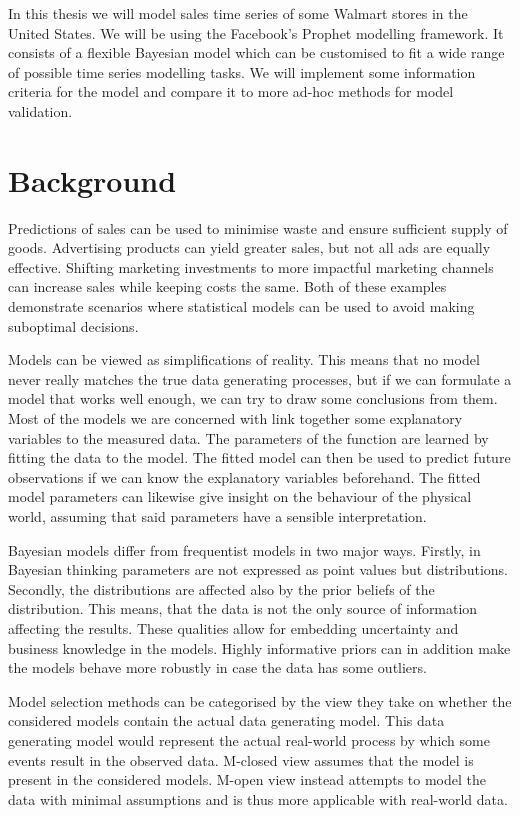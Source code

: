 \documentclass[english, 12pt, a4paper, sci, utf8, a-1b, online]{aaltothesis}
\begin{document}
In this thesis we will model sales time series of some Walmart stores in the United States. We will be using the Facebook's Prophet modelling framework. It consists of a flexible Bayesian model which can be customised to fit a wide range of possible time series modelling tasks. We will implement some information criteria for the model and compare it to more ad-hoc methods for model validation.




\section{Background}


Predictions of sales can be used to minimise waste and ensure sufficient supply of goods. Advertising products can yield greater sales, but not all ads are equally effective. Shifting marketing investments to more impactful marketing channels can increase sales while keeping costs the same. Both of these examples demonstrate scenarios where statistical models can be used to avoid making suboptimal decisions.

Models can be viewed as simplifications of reality. This means that no model never really matches the true data generating processes, but if we can formulate a model that works well enough, we can try to draw some conclusions from them. Most of the models we are concerned with link together some explanatory variables to the measured data. The parameters of the function are learned by fitting the data to the model. The fitted model can then be used to predict future observations if we can know the explanatory variables beforehand. The fitted model parameters can likewise give insight on the behaviour of the physical world, assuming that said parameters have a sensible interpretation.

Bayesian models differ from frequentist models in two major ways. Firstly, in Bayesian thinking parameters are not expressed as point values but distributions. Secondly, the distributions are affected also by the prior beliefs of the distribution. This means, that the data is not the only source of information affecting the results. These qualities allow for embedding uncertainty and business knowledge in the models. Highly informative priors can in addition make the models behave more robustly in case the data has some outliers. 

Model selection methods can be categorised by the view they take on whether the considered models contain the actual data generating model. This data generating model would represent the actual real-world process by which some events result in the observed data. M-closed view assumes that the model is present in the considered models. M-open view instead attempts to model the data with minimal assumptions and is thus more applicable with real-world data. 
\end{document}
